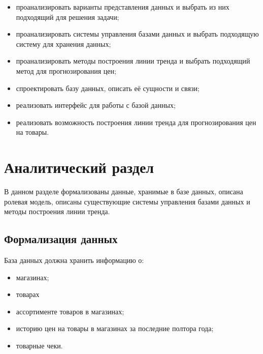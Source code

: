 \documentclass[a4paper,14pt]{extreport}
\begin{document}
\begin{itemize}
	\setlength\itemsep{0.05em}
	\item проанализировать варианты представления данных и выбрать из них подходящий для решения задачи;
	\item проанализировать системы управления базами данных и выбрать подходящую систему для хранения данных;
	\item проанализировать методы построения линии тренда и выбрать подходящий метод для прогнозирования цен;
	\item спроектировать базу данных, описать её сущности и связи;
	\item реализовать интерфейс для работы с базой данных;
	\item реализовать возможность построения линии тренда для прогнозирования цен на товары.
\end{itemize}
	
\chapter{Аналитический раздел}

В данном разделе формализованы данные, хранимые в базе данных, описана ролевая модель, описаны существующие системы управления базами данных и методы построения линии тренда.

\section{Формализация данных}

База данных должна хранить информацию о:

\begin{itemize}
	\setlength\itemsep{0.05em}
	\item магазинах;
	\item товарах
	\item ассортименте товаров в магазинах;
	\item историю цен на товары в магазинах за последние полтора года;
	\item товарные чеки.
\end{itemize}
\end{document}
